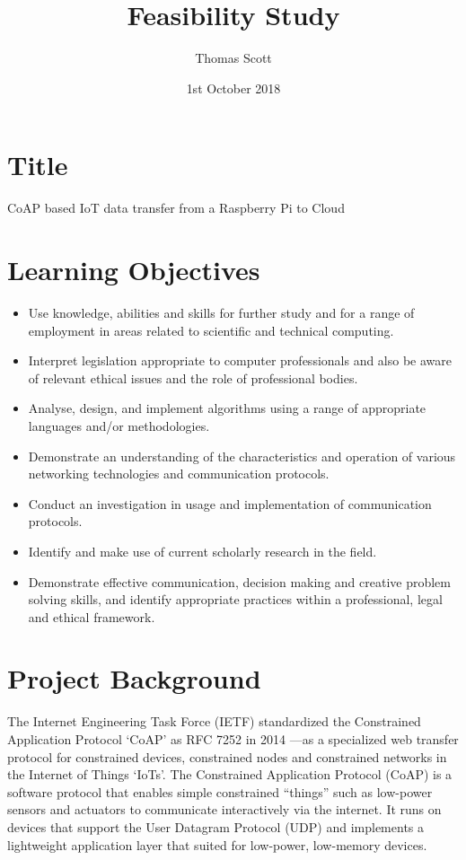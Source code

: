 \documentclass{article}
\title{Feasibility Study}
\author{Thomas Scott}
\date{1st October 2018}
\begin{document}
	\maketitle
	\newpage

	\section{Title}

	CoAP based IoT data transfer from a Raspberry Pi to Cloud 

	\section{Learning Objectives}
	
	\begin{itemize}	
	\item Use knowledge, abilities and skills for further study and for a range of employment in areas related to scientific and technical computing.
	\item Interpret legislation appropriate to computer professionals and also be aware of relevant ethical issues and the role of professional bodies.
	\item Analyse, design, and implement algorithms using a range of appropriate languages and/or methodologies.
	\item Demonstrate an understanding of the characteristics and operation of various networking technologies and communication protocols.
	\item Conduct an investigation in usage and implementation of communication protocols.
	\item Identify and make use of current scholarly research in the field.
	\item Demonstrate effective communication, decision making and creative problem solving skills, and identify appropriate practices within a professional, legal and ethical framework.
	\end{itemize}

	\section{Project Background}
	The Internet Engineering Task Force (IETF) standardized the Constrained Application Protocol ‘CoAP’ as RFC 7252 in 2014 —as a specialized web transfer protocol for constrained devices, constrained nodes and constrained networks in the Internet of Things ‘IoTs’. 
	The Constrained Application Protocol (CoAP) is a software protocol that enables simple constrained “things” such as low-power sensors and actuators to communicate interactively via the internet. 
	It runs on devices that support the User Datagram Protocol (UDP) and implements a lightweight application layer that suited for low-power, low-memory devices.
\end{document}

